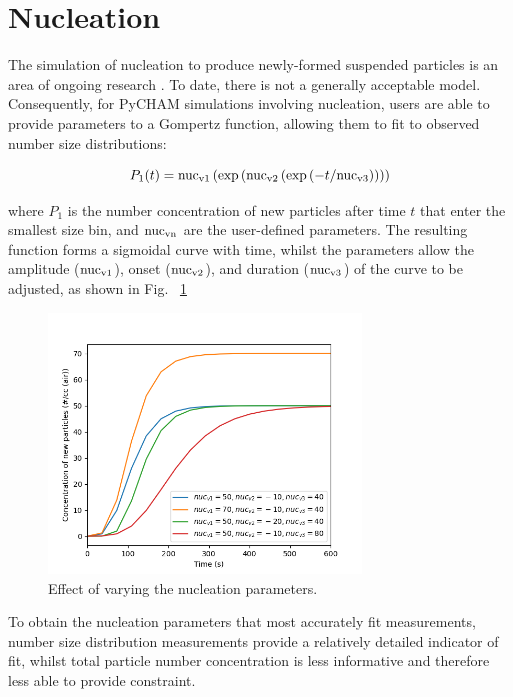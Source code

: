 \documentclass[gmd, manuscript]{copernicus}
\begin{document}
\section{Nucleation}

The simulation of nucleation to produce newly-formed suspended particles is an area of ongoing research \citep[e.g.][]{Kurten2018, Semeniuk2018, Li2020}.  To date, there is not a generally acceptable model.  Consequently, for PyCHAM simulations involving nucleation, users are able to provide parameters to a Gompertz function, allowing them to fit to observed number size distributions:

\begin{equation} \label{eq:Gompertz}
P_{1}(t) = \rm{nuc_{v1}}\left(\exp \left(\rm{nuc_{v2}}\left(\exp \left(\mit{-t}/\rm{nuc_{v3}} \right) \right) \right) \right)
\end{equation}

where $P_{1}$ is the number concentration of new particles after time $t$ that enter the smallest size bin, and $\rm{nuc_{vn}}$ are the user-defined parameters.  The resulting function forms a sigmoidal curve with time, whilst the parameters allow the amplitude ($\rm{nuc_{v1}}$), onset ($\rm{nuc_{v2}}$), and duration ($\rm{nuc_{v3}}$) of the curve to be adjusted, as shown in Fig. ~\ref{fig:nuc_sens}

\begin{figure}[t]
\includegraphics[width=8.3cm]{Results/nuc_sens.png}
\caption{Effect of varying the nucleation parameters.}
\label{fig:nuc_sens}
\end{figure}

To obtain the nucleation parameters that most accurately fit measurements, number size distribution measurements provide a relatively detailed indicator of fit, whilst total particle number concentration is less informative and therefore less able to provide constraint.
\end{document}
